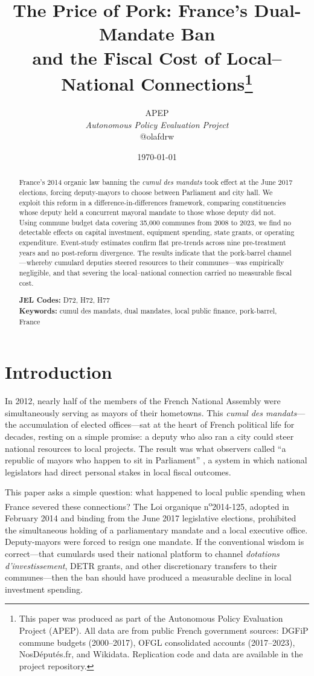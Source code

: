 \documentclass[12pt]{article}
\title{The Price of Pork: France's Dual-Mandate Ban\\and the Fiscal Cost of Local--National Connections\thanks{This paper was produced as part of the Autonomous Policy Evaluation Project (APEP). All data are from public French government sources: DGFiP commune budgets (2000--2017), OFGL consolidated accounts (2017--2023), NosDéputés.fr, and Wikidata. Replication code and data are available in the project repository.}}
\author{APEP \\ \textit{Autonomous Policy Evaluation Project} \\ @olafdrw}
\date{\today}
\begin{document}
\maketitle

\begin{abstract}
\noindent France's 2014 organic law banning the \textit{cumul des mandats} took effect at the June 2017 elections, forcing deputy-mayors to choose between Parliament and city hall. We exploit this reform in a difference-in-differences framework, comparing constituencies whose deputy held a concurrent mayoral mandate to those whose deputy did not. Using commune budget data covering 35,000 communes from 2008 to 2023, we find no detectable effects on capital investment, equipment spending, state grants, or operating expenditure. Event-study estimates confirm flat pre-trends across nine pre-treatment years and no post-reform divergence. The results indicate that the pork-barrel channel---whereby cumulard deputies steered resources to their communes---was empirically negligible, and that severing the local--national connection carried no measurable fiscal cost.

\medskip
\noindent\textbf{JEL Codes:} D72, H72, H77 \\
\textbf{Keywords:} cumul des mandats, dual mandates, local public finance, pork-barrel, France
\end{abstract}

\clearpage

\section{Introduction}

In 2012, nearly half of the members of the French National Assembly were simultaneously serving as mayors of their hometowns. This \textit{cumul des mandats}---the accumulation of elected offices---sat at the heart of French political life for decades, resting on a simple promise: a deputy who also ran a city could steer national resources to local projects. The result was what observers called ``a republic of mayors who happen to sit in Parliament'' \citep{francois2006cumul}, a system in which national legislators had direct personal stakes in local fiscal outcomes.

This paper asks a simple question: what happened to local public spending when France severed these connections? The Loi organique n\textsuperscript{o}2014-125, adopted in February 2014 and binding from the June 2017 legislative elections, prohibited the simultaneous holding of a parliamentary mandate and a local executive office. Deputy-mayors were forced to resign one mandate. If the conventional wisdom is correct---that cumulards used their national platform to channel \textit{dotations d'investissement}, DETR grants, and other discretionary transfers to their communes---then the ban should have produced a measurable decline in local investment spending.
\end{document}

